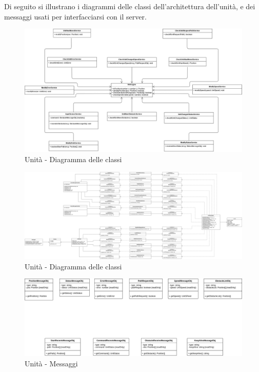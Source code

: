 	Di seguito si illustrano i diagrammi delle classi dell'architettura dell'unità, e dei messaggi usati per interfacciarsi con il server.

	\begin{landscape}
		\begin{figure}[h!]
			\includegraphics[width=25.5cm]{img/unit_architettura1.png}
			\caption{Unità - Diagramma delle classi}
		\end{figure}
	\end{landscape}

	\begin{landscape}
		\begin{figure}[h!]
			\includegraphics[width=25.5cm]{img/unit_architettura2.png}
			\caption{Unità - Diagramma delle classi}
		\end{figure}
	\end{landscape}


	\begin{landscape}
		\begin{figure}[H]
			\centering
			\includegraphics[width=25.5cm]{img/unit_messaggi.png}
			\caption{Unità - Messaggi}
		\end{figure}
	\end{landscape}